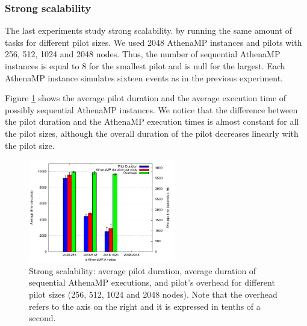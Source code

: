\subsubsection{Strong scalability}

The last experiments %
study strong scalability. %
by running the same amount of tasks for different pilot sizes. We used
2048 AthenaMP instances and %
pilots with 256, 512, 1024 and 2048 nodes. Thus, the number of sequential
AthenaMP instances is equal to 8 for the smallest pilot and is null for the
largest. Each AthenaMP instance
simulates sixteen events as in the previous experiment.

Figure \ref{fig:strongScala} %
shows the average pilot duration and the average execution time of possibly
sequential AthenaMP instances.  We %
notice that the difference between the pilot duration and the AthenaMP execution
times is almost constant for all the pilot sizes, although the overall duration
of the pilot decreases linearly with the pilot size.

\begin{figure}[!htb]
        \includegraphics[height=4.5cm,width=\columnwidth]{./figures/NGE/strong.pdf}
    \caption{Strong scalability:  average pilot duration, average duration of
    sequential AthenaMP executions, and pilot's overhead for different pilot
    sizes (256, 512, 1024 and 2048 nodes). Note that the overhead refers to the
    axis on the right and it is expressed in tenths of a second.}
\label{fig:strongScala}
\end{figure}

%

